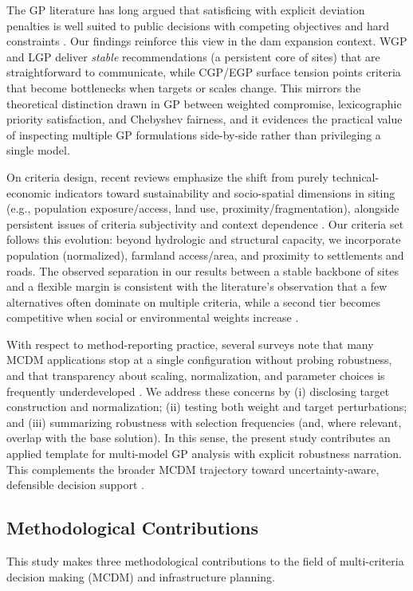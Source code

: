 The GP literature has long argued that satisficing with explicit deviation penalties is well suited to public decisions with competing objectives and hard constraints \cite{JonesTamiz2010_PracticalGP}. Our findings reinforce this view in the dam expansion context. WGP and LGP deliver \textit{stable} recommendations (a persistent core of sites) that are straightforward to communicate, while CGP/EGP surface tension points criteria that become bottlenecks when targets or scales change. This mirrors the theoretical distinction drawn in GP between weighted compromise, lexicographic priority satisfaction, and Chebyshev fairness, and it evidences the practical value of inspecting multiple GP formulations side-by-side rather than privileging a single model.

On criteria design, recent reviews emphasize the shift from purely technical-economic indicators toward sustainability and socio-spatial dimensions in siting (e.g., population exposure/access, land use, proximity/fragmentation), alongside persistent issues of criteria subjectivity and context dependence \cite{KUMAR2017596,Aruldoss2013}. Our criteria set follows this evolution: beyond hydrologic and structural capacity, we incorporate population (normalized), farmland access/area, and proximity to settlements and roads. The observed separation in our results between a stable backbone of sites and a flexible margin is consistent with the literature's observation that a few alternatives often dominate on multiple criteria, while a second tier becomes competitive when social or environmental weights increase \cite{Aruldoss2013}.

With respect to method-reporting practice, several surveys note that many MCDM applications stop at a single configuration without probing robustness, and that transparency about scaling, normalization, and parameter choices is frequently underdeveloped \cite{Aruldoss2013}. We address these concerns by (i) disclosing target construction and normalization; (ii) testing both weight and target perturbations; and (iii) summarizing robustness with selection frequencies (and, where relevant, overlap with the base solution). In this sense, the present study contributes an applied template for multi-model GP analysis with explicit robustness narration. This complements the broader MCDM trajectory toward uncertainty-aware, defensible decision support \cite{jones2010,Mardani2015}.

\subsection{Methodological Contributions}
This study makes three methodological contributions to the field of multi-criteria decision making (MCDM) and infrastructure planning. 

